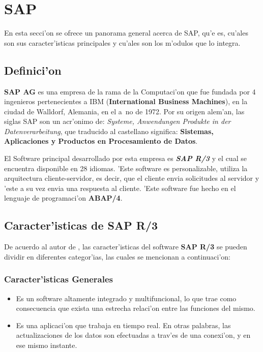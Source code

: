 \section{SAP} \label{sect:sap}

En esta secci'on se ofrece un panorama general acerca de SAP, qu'e es, cu'ales son sus caracter'isticas principales y cu'ales son los m'odulos que lo integra.

\subsection{Definici'on} \label{subsect:defprop}
\textbf{SAP AG} es una empresa de la rama de la Computaci'on que fue fundada por 4 ingenieros pertenecientes a IBM (\textbf{International Business Machines}), en la ciudad de Walldorf, Alemania, en el a~no de 1972. Por su origen alem'an, las siglas SAP son un acr'onimo de: \textit{Systeme, Anwendungen Produkte in der Datenverarbeitung}, que traducido al castellano significa: \textbf{Sistemas, Aplicaciones y Productos en Procesamiento de Datos}. 

El Software principal desarrollado por esta empresa es \textbf{\textit{SAP R/3}} y el cual se encuentra disponible en 28 idiomas. 'Este software es personalizable, utiliza la arquitectura cliente-servidor, es decir, que el cliente envia solicitudes al servidor y 'este a su vez envia una respuesta al cliente. 'Este software fue hecho en el lenguaje de programaci'on \textbf{ABAP/4}. 

\subsection{Caracter'isticas de SAP R/3}
De acuerdo al autor de \cite{SAP01}, las caracter'isticas del software \textbf{SAP R/3} se pueden dividir en diferentes categor'ias, las cuales se mencionan a continuaci'on:

\subsubsection{Caracter'isticas Generales}
\begin{itemize}
\item Es un software altamente integrado y multifuncional, lo que trae como consecuencia que exista una estrecha relaci'on entre las funciones del mismo.
\item Es una aplicaci'on que trabaja en tiempo real. En otras palabras, las actualizaciones de los datos son efectuadas a trav'es de una conexi'on, y en ese mismo instante.
\end{itemize}
